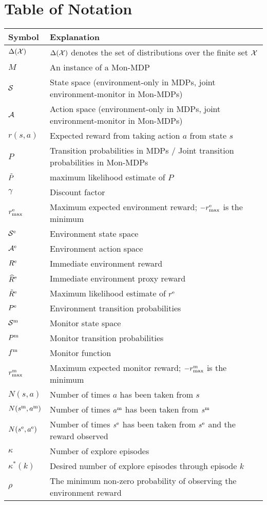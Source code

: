 \section{Table of Notation}
\begin{tabular}{ l l } 
 \hline
 \textbf{Symbol} & \textbf{Explanation} \\
 \hline
 $\Delta(\mathcal{X})$ & $\Delta(\mathcal{X})$ denotes the set of distributions over the finite set $\mathcal{X}$  \\ 
 $M$ & An instance of a Mon-MDP  \\ 
 $\mathcal{S}$ & State space (environment-only in MDPs, joint environment-monitor in Mon-MDPs)  \\ 
 $\mathcal{A}$ & Action space (environment-only in MDPs, joint environment-monitor in Mon-MDPs)  \\ 
 $r(s, a)$ & Expected reward from taking action $a$ from state $s$\\ 
 $P$ & Transition probabilities in MDPs / Joint transition probabilities in Mon-MDPs  \\ 
 $\tilde{P}$ & maximum likelihood estimate of $P$  \\
 $\gamma$ & Discount factor \\
 $r_{\text{max}}^\text{e}$ & Maximum expected environment reward; $-r_{\text{max}}^\text{e}$ is the minimum \\
 $\mathcal{S}^\text{e}$ & Environment state space  \\ 
 $\mathcal{A}^\text{e}$ & Environment action space  \\ 
 $R^\text{e}$ & Immediate environment reward  \\
 $\widehat{R}^\text{e}$ & Immediate environment proxy reward  \\
$\tilde{R}^\text{e}$ & Maximum likelihood estimate of $r^\text{e}$  \\
$P^\text{e}$ & Environment transition probabilities  \\ 
 $\mathcal{S}^\text{m}$ & Monitor state space  \\ 
  $P^\text{m}$ & Monitor transition probabilities  \\ 
 $f^\text{m}$ & Monitor function  \\
 $r_{\text{max}}^\text{m}$ & Maximum expected monitor reward; $-r_{\text{max}}^\text{m}$ is the minimum\\
 $N(s, a)$ & Number of times  $a$ has been taken from $s$ \\
 $N(s^\text{m}, a^\text{m})$ &  Number of times $a^\text{m}$ has been taken from $s^\text{m}$ \\
$N(s^\text{e}, a^\text{e})$ & Number of times $s^\text{e}$ has been taken from $s^\text{e}$ and the reward observed \\
 $\kappa$& Number of explore episodes \\
 $\kappa^*(k)$ & Desired number of explore episodes through episode $k$ \\
 $\rho$ & The minimum non-zero probability of observing the environment reward\\
 \hline
\end{tabular}